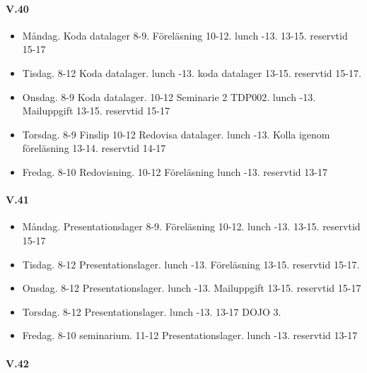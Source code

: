 \documentclass{article}
\begin{document}
\paragraph{V.40}

\begin{itemize}
\item	Måndag. Koda datalager 8-9. Föreläsning 10-12. lunch -13.  13-15. reservtid 15-17 

\item	Tisdag. 8-12 Koda datalager. lunch -13. koda datalager 13-15. reservtid 15-17.

\item	Onsdag. 8-9 Koda datalager. 10-12 Seminarie 2 TDP002. lunch -13. Mailuppgift 13-15. reservtid 15-17

\item	Torsdag. 8-9 Finslip 10-12 Redovisa datalager. lunch -13. Kolla igenom föreläsning 13-14. reservtid 14-17

\item	Fredag. 8-10 Redovisning. 10-12 Föreläsning lunch -13. reservtid 13-17
\end{itemize}


\paragraph{V.41}

\begin{itemize}
\item	Måndag. Presentationslager 8-9. Föreläsning 10-12. lunch -13.  13-15. reservtid 15-17 

\item	Tisdag. 8-12 Presentationslager. lunch -13. Föreläsning 13-15. reservtid 15-17.

\item	Onsdag. 8-12 Presentationslager. lunch -13. Mailuppgift 13-15. reservtid 15-17

\item	Torsdag. 8-12 Presentationslager. lunch -13. 13-17 DOJO 3.

\item	Fredag. 8-10 seminarium. 11-12 Presentationslager. lunch -13. reservtid 13-17
\end{itemize}


\paragraph{V.42}
\end{document}
